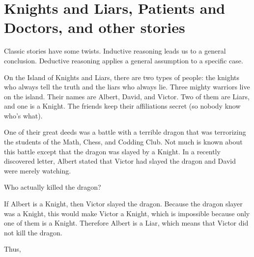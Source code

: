 \documentclass{article}
\begin{document}
\newpage 

\section*{Knights and Liars, Patients and Doctors, and other stories}

Classic stories have some twists. Inductive reasoning leads us to a general conclusion.
Deductive reasoning applies a general assumption to a specific case.

\begin{example*}
    \label{example:pi-2022-4-p10}
    On the Island of Knights and Liars, there are two types of people:
    the knights who always tell the truth and the liars who always lie.
    Three mighty warriors live on the island.
    Their names are Albert, David, and Victor.
    Two of them are Liars, and one is a Knight.
    The friends keep their affiliations secret (so nobody know who's what).

    One of their great deeds was a battle with a terrible dragon
    that was terrorizing the students of the Math, Chess, and Codding Club.
    Not much is known about this battle except that the dragon was slayed by a Knight.
    In a recently discovered letter, Albert stated that Victor had slayed the dragon
    and David were merely watching.

    Who actually killed the dragon?
\end{example*}

\begin{soln} 
    If Albert is a Knight, then Victor slayed the dragon.
    Because the dragon slayer was a Knight, this would make Victor a Knight,
    which is impossible because only one of them is a Knight.
    Therefore Albert is a Liar, which means that Victor did not kill the dragon.
    
    Thus, 
\end{soln}
\end{document}
